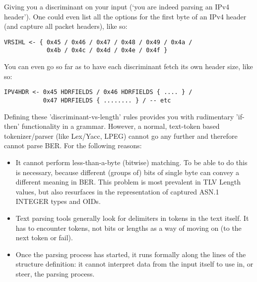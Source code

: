 Giving you a discriminant on your input (‘you are indeed parsing an IPv4 
header’). One could even list all the options for the first byte of an 
IPv4 header (and capture all packet headers), like so:

\begin{changemargin}{-60mm}{0mm}
\begin{myquote}
\begin{verbatim}
VRSIHL <- { 0x45 / 0x46 / 0x47 / 0x48 / 0x49 / 0x4a /
            0x4b / 0x4c / 0x4d / 0x4e / 0x4f }
\end{verbatim}
\end{myquote}
\end{changemargin}

You can even go so far as to have each discriminant fetch its own header 
size, like so:

\begin{changemargin}{-60mm}{0mm}
\begin{myquote}
\begin{verbatim}
IPV4HDR <- 0x45 HDRFIELDS / 0x46 HDRFIELDS { .... } /
           0x47 HDRFIELDS { ........ } / -- etc
\end{verbatim}
\end{myquote}
\end{changemargin}

Defining these 'discriminant-vs-length' rules provides you with
rudimentary 'if-then' functionality in a grammar.
However, a normal, text-token based tokenizer/parser (like Lex/Yacc, LPEG) 
cannot go any further and therefore cannot parse BER. For the following 
reasons:

\begin{itemize}
    \item It cannot perform less-than-a-byte (bitwise) matching. To be able 
to do this is necessary, because different (groups of) bits of single byte 
can convey a different meaning in BER. This problem is most prevalent in 
TLV Length values, but also resurfaces in the representation of captured 
ASN.1 INTEGER types and OIDs.
    \item Text parsing tools generally look for delimiters in tokens in the 
text itself. It has to encounter tokens, not bits or lengths as a way of 
moving on (to the next token or fail).
    \item Once the parsing process has started, it runs formally along the 
lines of the structure definition: it cannot interpret data from the input 
itself to use in, or steer, the parsing process. 
\end{itemize}

